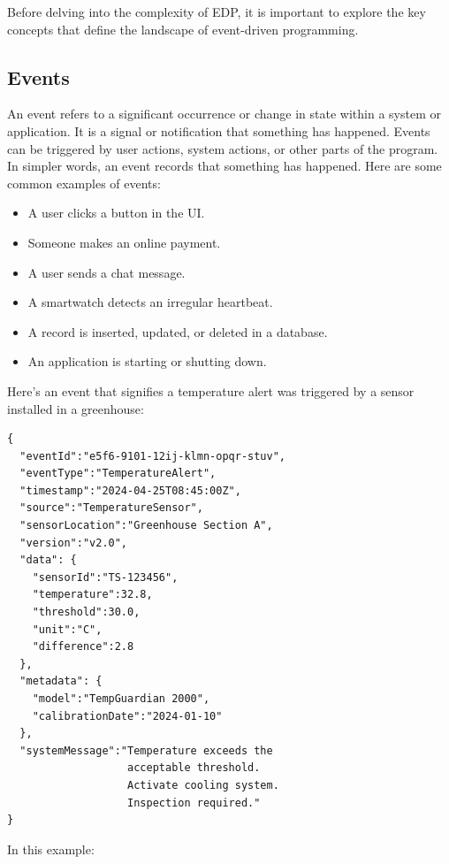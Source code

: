\documentclass[twocolumn]{article}
\begin{document}
Before delving into the complexity of EDP, it is important to explore the key concepts that define the landscape of event-driven programming.

\subsection{Events}

An event refers to a significant occurrence or change in state within a system or application. \cite{quixWhatEventdriven} 
It is a signal or notification that something has happened. Events can be triggered by user actions, system actions, or other parts of the program. \cite{EventdrivenProgramming}  
In simpler words, an event records that something has happened.  
Here are some common examples of events:

\begin{itemize}
     \item A user clicks a button in the UI.
     \item Someone makes an online payment.
     \item A user sends a chat message.
     \item A smartwatch detects an irregular heartbeat.
     \item A record is inserted, updated, or deleted in a database.
     \item An application is starting or shutting down.
\end{itemize}

Here’s an event that signifies a temperature alert was triggered by a sensor installed in a greenhouse:
          
\begin{lstlisting}[style=smallcode]
{
  "eventId":"e5f6-9101-12ij-klmn-opqr-stuv",
  "eventType":"TemperatureAlert",
  "timestamp":"2024-04-25T08:45:00Z",
  "source":"TemperatureSensor",
  "sensorLocation":"Greenhouse Section A",
  "version":"v2.0",
  "data": {
    "sensorId":"TS-123456",
    "temperature":32.8,
    "threshold":30.0,
    "unit":"C",
    "difference":2.8
  },
  "metadata": {
    "model":"TempGuardian 2000",
    "calibrationDate":"2024-01-10"
  },
  "systemMessage":"Temperature exceeds the 
                   acceptable threshold. 
                   Activate cooling system. 
                   Inspection required."
}
\end{lstlisting}

In this example:
\end{document}

